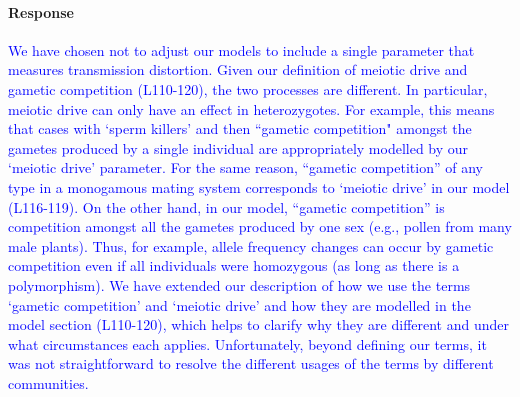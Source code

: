 \documentclass[10pt,letterpaper]{article}
\begin{document}
\noindent\paragraph{Response}
\textcolor{blue}{
We have chosen not to adjust our models to include a single parameter that measures transmission distortion. 
Given our definition of meiotic drive and gametic competition (L110-120), the two processes are different.
In particular, meiotic drive can only have an effect in heterozygotes.
For example, this means that cases with `sperm killers' and then ``gametic competition" amongst the gametes produced by a single individual are appropriately modelled by our `meiotic drive' parameter. 
For the same reason, ``gametic competition'' of any type in a monogamous mating system corresponds to `meiotic drive' in our model (L116-119). 
On the other hand, in our model, ``gametic competition'' is competition amongst all the gametes produced by one sex (e.g., pollen from many male plants).
Thus, for example, allele frequency changes can occur by gametic competition even if all individuals were homozygous (as long as there is a polymorphism).
We have extended our description of how we use the terms `gametic competition' and `meiotic drive' and how they are modelled in the model section (L110-120), which helps to clarify why they are different and under what circumstances each applies. 
Unfortunately, beyond defining our terms, it was not straightforward to resolve the different usages of the terms by different communities.
}
\end{document}
